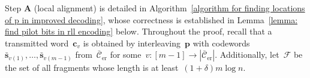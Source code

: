 \documentclass[journal,letterpaper,onecolumn,11pt]{IEEEtran}
\newcommand{\cC}{\mathcal{C}}
\newcommand{\cF}{\mathcal{F}}
\newcommand{\boldc}{\mathbf{c}}
\newcommand{\boldp}{\mathbf{p}}
\newcommand{\bolds}{\mathbf{s}}
\begin{document}
Step \textbf{A} (local alignment) is detailed in Algorithm~\ref{algorithm for finding locations of p in improved decoding}, whose correctness is established in Lemma~\ref{lemma: find pilot bits in rll encoding} below. 
Throughout the proof, recall that a transmitted word~$\boldc_v$ is obtained by interleaving~$\boldp$ with codewords~$\bar{\bolds}_{v(1)},\ldots,\bar{\bolds}_{v(m-1)}$ from~$\bar{\cC}_{\text{er}}$ for some~$v:[m-1]\to |\bar{\cC}_\text{er}|$.
Additionally, let~$\cF$ be the set of all fragments whose length is at least~$(1+\delta)m\log n$.
\end{document}
